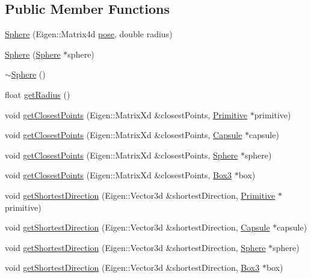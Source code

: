\subsection*{Public Member Functions}
\begin{DoxyCompactItemize}
\item 
\hyperlink{class_sphere_a7a9a9cfc01f619bb8cda60ae907d6372}{Sphere} (Eigen\+::\+Matrix4d \hyperlink{class_primitive_ad8b2afbad412f6046783d155c88fe312}{pose}, double radius)
\item 
\hyperlink{class_sphere_a564eb09ed988535e33c2b2e701d80581}{Sphere} (\hyperlink{class_sphere}{Sphere} $\ast$sphere)
\item 
\hyperlink{class_sphere_a569c071e50a3e11f678630ee1a17737e}{$\sim$\+Sphere} ()
\item 
float \hyperlink{class_sphere_a330dd34c7c7b6dfff106c4c71ec80028}{get\+Radius} ()
\item 
void \hyperlink{class_sphere_a9290773136dacf81a9f147343a7a0486}{get\+Closest\+Points} (Eigen\+::\+Matrix\+Xd \&closest\+Points, \hyperlink{class_primitive}{Primitive} $\ast$primitive)
\item 
void \hyperlink{class_sphere_a903c1c7a459e0c048b6f36a4f1376256}{get\+Closest\+Points} (Eigen\+::\+Matrix\+Xd \&closest\+Points, \hyperlink{class_capsule}{Capsule} $\ast$capsule)
\item 
void \hyperlink{class_sphere_ac2584cb5fb1d066a9527f8c95435093b}{get\+Closest\+Points} (Eigen\+::\+Matrix\+Xd \&closest\+Points, \hyperlink{class_sphere}{Sphere} $\ast$sphere)
\item 
void \hyperlink{class_sphere_a767b854824cf434a399a81160082254c}{get\+Closest\+Points} (Eigen\+::\+Matrix\+Xd \&closest\+Points, \hyperlink{class_box3}{Box3} $\ast$box)
\item 
void \hyperlink{class_sphere_a707fc14e03a6ff67ac012a18b2a8cb28}{get\+Shortest\+Direction} (Eigen\+::\+Vector3d \&shortest\+Direction, \hyperlink{class_primitive}{Primitive} $\ast$primitive)
\item 
void \hyperlink{class_sphere_af7ff30023363261cf118d1fb80c745a7}{get\+Shortest\+Direction} (Eigen\+::\+Vector3d \&shortest\+Direction, \hyperlink{class_capsule}{Capsule} $\ast$capsule)
\item 
void \hyperlink{class_sphere_a719592bc6a8307060f49f289da631310}{get\+Shortest\+Direction} (Eigen\+::\+Vector3d \&shortest\+Direction, \hyperlink{class_sphere}{Sphere} $\ast$sphere)
\item 
void \hyperlink{class_sphere_abed1feeaf6a2f63eabba2a86a4fe7041}{get\+Shortest\+Direction} (Eigen\+::\+Vector3d \&shortest\+Direction, \hyperlink{class_box3}{Box3} $\ast$box)

\end{DoxyCompactItemize}
